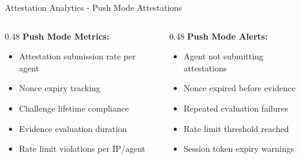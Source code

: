 \begin{frame}{Attestation Analytics - Push Mode Attestations}
  \scriptsize
  \begin{columns}[T]
    \begin{column}{0.48\textwidth}
      \textbf{Push Mode Metrics:}
      \begin{itemize}
        \item Attestation submission rate per agent
        \item Nonce expiry tracking
        \item Challenge lifetime compliance
        \item Evidence evaluation duration
        \item Rate limit violations per IP/agent
      \end{itemize}
    \end{column}
    \begin{column}{0.48\textwidth}
      \textbf{Push Mode Alerts:}
      \begin{itemize}
        \item Agent not submitting attestations
        \item Nonce expired before evidence
        \item Repeated evaluation failures
        \item Rate limit threshold reached
        \item Session token expiry warnings
      \end{itemize}
    \end{column}
  \end{columns}
\end{frame}
